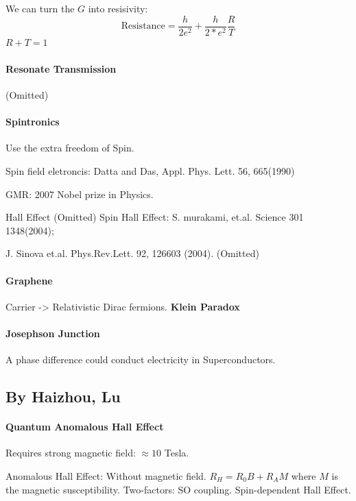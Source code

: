 \documentclass{article}
\numberwithin{equation}{subsection} %
\theoremstyle{definition}
\begin{document}
    We can turn the $G$ into resisivity: 
    $$\text{Resistance}= \frac{h}{2e^2} + \frac{h}{2*e^2}\frac{R}{T}$$
    $R+T=1$

    \paragraph{Resonate Transmission} (Omitted)

    \paragraph{Spintronics} Use the extra freedom of Spin. 
    
    Spin field eletroncis: Datta and Das, Appl. Phys. Lett. 56, 665(1990)

    GMR: 2007 Nobel prize in Physics.
    
    Hall Effect (Omitted)
    Spin Hall Effect: S. murakami, et.al. Science 301 1348(2004);
    

    J. Sinova et.al. Phys.Rev.Lett. 92, 126603 (2004). (Omitted)
    
    \paragraph{Graphene} Carrier -> Relativistic Dirac fermions.
    \textbf{Klein Paradox} 

    \paragraph{Josephson Junction} A phase difference could conduct
    electricity in Superconductors.
    


    \subsection{By Haizhou, Lu}
    \paragraph{Quantum Anomalous Hall Effect}
    Requires strong magnetic field: $\approx 10$ Tesla.

    Anomalous Hall Effect: Without magnetic field. $R_H = R_0 B+ R_A M$
    where $M$ is the magnetic susceptibility.
    Two-factors: SO coupling. Spin-dependent Hall Effect.
    
\end{document}
